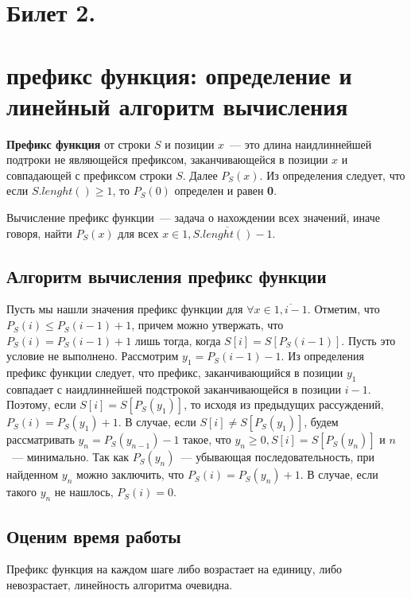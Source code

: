 \section{Билет 2.}
\section*{префикс функция: определение и линейный алгоритм вычисления}
\par
\textbf{Префикс функция} от строки $S$ и позиции $x$~--- это длина наидлиннейшей
подтроки не являющейся префиксом, заканчивающейся в позиции $x$ и совпадающей с префиксом строки $S$.
Далее $P_S(x)$. Из определения следует, что если $S.lenght() \geq 1$, то $P_S(0)$
определен и равен \textbf{0}.

\par
Вычисление префикс функции~--- задача о нахождении всех значений, иначе говоря,
найти $P_S(x)$ для всех $x \in \overline{1, S.lenght() - 1}$.

\subsection*{Алгоритм вычисления префикс функции}

\par
Пусть мы нашли значения префикс функции для $\forall x \in \overline{1, i - 1}$.
Отметим, что $P_S(i) \leq P_S(i - 1) + 1$, причем можно утвержать, что
$P_S(i) = P_S(i-1) + 1$ лишь тогда, когда $S[i] = S[P_S(i-1)]$. Пусть это условие
не выполнено. Рассмотрим $y_1 = P_S(i - 1) - 1$. Из определения префикс функции
следует, что префикс, заканчивающийся в позиции $y_1$ совпадает с наидлиннейшей
подстрокой заканчивающейся в позиции $i - 1$. Поэтому, если $S[i] = S[P_S(y_1)]$,
то исходя из предыдущих рассуждений, $P_S(i) = P_S(y_1) + 1$.
В случае, если $S[i] \neq S[P_S(y_1)]$, будем рассматривать $y_n = P_S(y_{n-1}) - 1$
такое, что $y_n \geq 0, S[i] = S[P_S(y_n)]$ и $n$~--- минимально.
Так как $P_S(y_n)$~--- убывающая последовательность, при найденном $y_n$
можно заключить, что $P_S(i) = P_S(y_n) + 1$. В случае, если такого $y_n$ не
нашлось, $P_S(i) = 0$.

\subsection*{Оценим время работы}

Префикс функция на каждом шаге либо возрастает на единицу, либо невозрастает,
линейность алгоритма очевидна.